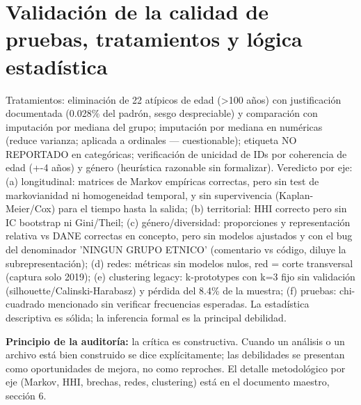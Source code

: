 \section{Validación de la calidad de pruebas, tratamientos y lógica estadística}

Tratamientos: eliminación de 22 atípicos de edad (>100 años) con justificación documentada (0.028\% del padrón, sesgo despreciable) y comparación con imputación por mediana del grupo; imputación por mediana en numéricas (reduce varianza; aplicada a ordinales --- cuestionable); etiqueta NO REPORTADO en categóricas; verificación de unicidad de IDs por coherencia de edad (+-4 años) y género (heurística razonable sin formalizar). Veredicto por eje: (a) longitudinal: matrices de Markov empíricas correctas, pero sin test de markovianidad ni homogeneidad temporal, y sin supervivencia (Kaplan-Meier/Cox) para el tiempo hasta la salida; (b) territorial: HHI correcto pero sin IC bootstrap ni Gini/Theil; (c) género/diversidad: proporciones y representación relativa vs DANE correctas en concepto, pero sin modelos ajustados y con el bug del denominador 'NINGUN GRUPO ETNICO' (comentario vs código, diluye la subrepresentación); (d) redes: métricas sin modelos nulos, red = corte transversal (captura solo 2019); (e) clustering legacy: k-prototypes con k=3 fijo sin validación (silhouette/Calinski-Harabasz) y pérdida del 8.4\% de la muestra; (f) pruebas: chi-cuadrado mencionado sin verificar frecuencias esperadas. La estadística descriptiva es sólida; la inferencia formal es la principal debilidad.


\begin{tcolorbox}[nota]
\textbf{Principio de la auditoría:} la crítica es constructiva. Cuando un
análisis o un archivo está bien construido se dice explícitamente; las
debilidades se presentan como oportunidades de mejora, no como reproches.
El detalle metodológico por eje (Markov, HHI, brechas, redes, clustering)
está en el documento maestro, sección 6.
\end{tcolorbox}
